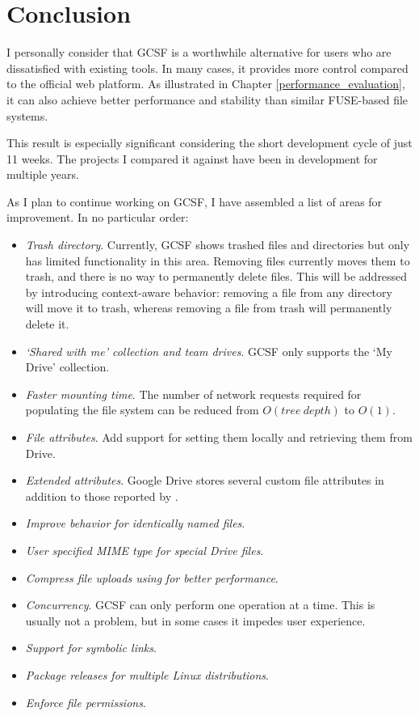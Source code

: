 \chapter{Conclusion}\label{conclusion}

I personally consider that GCSF is a worthwhile alternative for users who are dissatisfied with existing tools. In many cases, it provides more control compared to the official web platform. As illustrated in Chapter \ref{performance_evaluation}, it can also achieve better performance and stability than similar FUSE-based file systems.

This result is especially significant considering the short development cycle of just 11 weeks. The projects I compared it against have been in development for multiple years.

As I plan to continue working on GCSF, I have assembled a list of areas for improvement. In no particular order:

\begin{itemize}
  \itemsep0em
  \item \emph{Trash directory}. Currently, GCSF shows trashed files and directories but only has limited functionality in this area. Removing files currently moves them to trash, and there is no way to permanently delete files. This will be addressed by introducing context-aware behavior: removing a file from any directory will move it to trash, whereas removing a file from trash will permanently delete it.
  \item \emph{`Shared with me' collection and team drives}. GCSF only supports the `My Drive' collection.
  \item \emph{Faster mounting time}. The number of network requests required for populating the file system can be reduced from $ O(tree~depth) $ to $ O(1) $.
  \item \emph{File attributes}. Add support for setting them locally and retrieving them from Drive.
  \item \emph{Extended attributes}. Google Drive stores several custom file attributes in addition to those reported by .
  \item \emph{Improve behavior for identically named files}.
  \item \emph{User specified MIME type for special Drive files}.
  \item \emph{Compress file uploads using}  \emph{for better performance}.
  \item \emph{Concurrency}. GCSF can only perform one operation at a time. This is usually not a problem, but in some cases it impedes user experience.
  \item \emph{Support for symbolic links}.
  \item \emph{Package releases for multiple Linux distributions}.
  \item \emph{Enforce file permissions}.

\end{itemize}
